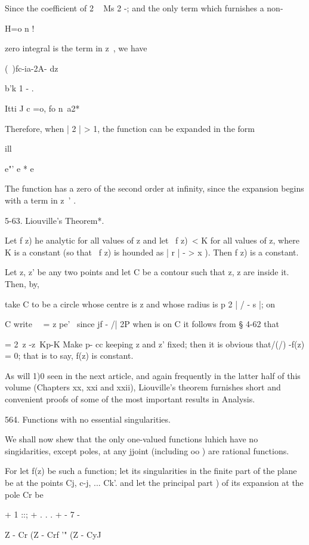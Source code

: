 {{{{Since the coefficient of 2 ~ Ms 2 -; and the only term which
furnishes a non-

H=o n !

zero integral is the term in z~, we have

(\ )fc-ia-2A- dz

b'k  1 - .

Itti J c =o, fo n\ a2*

%
%

Therefore, when | 2 | > 1, the function can be expanded in the form

ill

e"' e * e

The function has a zero of the second order at infinity, since the
expansion begins with a term in z~' .

5-63. Liouville's Theorem*.

Let f z) he analytic for all values of z and let \ f z)\ < K for all
values of z, where K is a constant (so that \ f z) is hounded as | r |
- > x ). Then f z) is a constant.

Let z, z' be any two points and let C be a contour such that z, z are
inside it. Then, by,

take C to be a circle whose centre is z and whose radius is p 2 | / -
s |; on

C write \ \ = z pe' \ since jf - /| 2P when is on C it follows from §
4-62 that

= 2\ z -z\ Kp-K Make p- cc keeping z and z' fixed; then it is obvious
that/(/) -f(z) = 0; that is to say, f(z) is constant.

As will 1)0 seen in the next article, and again frequently in the
latter half of this volume (Chapters xx, xxi and xxii), Liouville's
theorem furnishes short and convenient proofs of some of the most
important results in Analysis.

564. Functions with no essential singularities.

We shall now shew that the only one-valued functions luhich have no
singidarities, except poles, at any jjoint (including oo ) are
rational functions.

For let f(z) be such a function; let its singularities in the finite
part of the plane be at the points Cj, c-j, ... Ck'. and let the
principal part ) of its expansion at the pole Cr be

+ 1 ::; + . . . + - 7 -

Z - Cr (Z - Crf '" (Z - CyJ

}}}}
